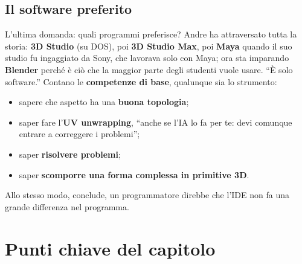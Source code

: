 \subsection{Il software preferito}

L'ultima domanda: quali programmi preferisce? Andre ha attraversato tutta la
storia: \textbf{3D Studio} (su DOS), poi \textbf{3D Studio Max}, poi \textbf{Maya}
quando il suo studio fu ingaggiato da Sony, che lavorava solo con Maya; ora sta
imparando \textbf{Blender} perché è ciò che la maggior parte degli studenti vuole
usare. ``È solo software.'' Contano le \textbf{competenze di base}, qualunque sia lo
strumento:
\begin{itemize}
  \item sapere che aspetto ha una \textbf{buona topologia};
  \item saper fare l'\textbf{UV unwrapping}, ``anche se l'IA lo fa per te: devi
        comunque entrare a correggere i problemi'';
  \item saper \textbf{risolvere problemi};
  \item saper \textbf{scomporre una forma complessa in primitive 3D}.
\end{itemize}
Allo stesso modo, conclude, un programmatore direbbe che l'IDE non fa una grande
differenza nel programma.

\section*{Punti chiave del capitolo}

